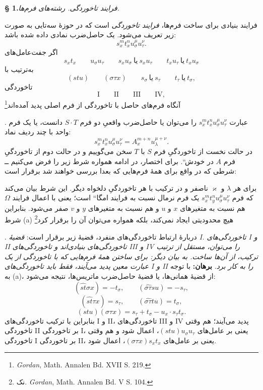 \documentclass[11pt]{article}
\providecommand{\glqq}{\textquotedblbase}
\providecommand{\grqq}{\textquotedblleft}
\providecommand{\srcnumdisplay}[3][3.4em]{%
  \par\smallskip\noindent
  \babelsublr{\begin{minipage}[t]{#1}\vspace*{0pt}\srcLTR{#2}\end{minipage}%
  \begin{minipage}[t]{\dimexpr\linewidth-#1\relax}\vspace*{0pt}\centering
  \(\displaystyle #3\)\end{minipage}}\par\smallskip}
\newcommand{\srcLTR}[1]{\relax\ifmmode\text{\mbox{\babelsublr{\foreignlanguage{english}{#1}}}}\else\babelsublr{\foreignlanguage{english}{#1}}\fi}
\newcommand{\srcfn}[2]{\begingroup\renewcommand{\thefootnote}{\srcLTR{#1}}\footnote{#2}\addtocounter{footnote}{-1}\endgroup}
\begin{document}
\begin{center}
\textbf{§ 1.}\quad \emph{فرایند تاخوردگی. رشته‌های فرم‌ها.}
\end{center}

فرایند بنیادی برای ساخت فرم‌ها، \emph{فرایند تاخوردگی} است که در حوزهٔ سه‌تایی به صورت زیر تعریف می‌شود. یک حاصل‌ضرب نمادی داده شده باشد:
\[
s_x^m t_x^n u_\sigma^\mu u_\tau^\nu .
\]
اگر جفت‌عامل‌های
\[
s_xt_x\qquad u_\sigma u_\tau\qquad s_xu_\sigma\ \text{یا}\ s_xu_\tau
\qquad t_xu_\tau\ \text{یا}\ t_xu_\sigma
\]
به‌ترتیب با
\[
(stu)\qquad (\sigma\tau x)\qquad s_\sigma\ \text{یا}\ s_\tau
\qquad t_\tau\ \text{یا}\ t_\sigma,
\]
تاخوردگی
\[
\text{I}\qquad\text{II}\qquad\text{III}\qquad\text{IV},
\]
آنگاه فرم‌های حاصل با تاخوردگی از فرم اصلی پدید آمده‌اند\srcfn{*)}{\emph{Gordan}, Math. Annalen Bd. XVII S. 219.}.
عبارت $s_x^m t_x^n u_\sigma^\mu u_\tau^\nu$ را می‌توان یا حاصل‌ضرب واقعیِ دو فرم $S\cdot T$ دانست، یا یک فرم واحد با چند ردیف نماد:
\[
s_x^m t_x^n u_\sigma^\mu u_\tau^\nu=A_x^{m+n}u_\lambda^{\mu+\nu}.
\]
در حالت نخست از تاخوردگیِ فرم $S$ با $T$ سخن می‌گوییم و در حالت دوم از \glqq{}تاخوردگیِ فرم $A$ در خودش\grqq{}. برای اختصار، در ادامه همواره شرط زیر را فرض می‌کنیم ــ شرطی که در واقع برای همهٔ فرم‌هایی که بعدا بررسی خواهند شد برقرار است:
\srcnumdisplay{(a)}{\begin{gathered}
s_\sigma^\lambda=0,\\
t_\tau^\varkappa=0
\end{gathered}}
برای هر $\lambda$ و $\varkappa$ ناصفر و در ترکیب با هر تاخوردگیِ دلخواه دیگر. این شرط بیان می‌کند که فرم $s_x^m t_y^n u_\sigma^\mu u_\tau^\nu$ یک \glqq{}فرم نرمال نسبت به فرایند امگا\grqq{} است؛ یعنی با اعمال فرایند $\Omega$ هم نسبت به متغیرهای $x$ و $u$ و هم نسبت به متغیرهای $y$ و $v$ صفر می‌شود.
بنابراین شرط (a) هیچ محدودیتی ایجاد نمی‌کند، بلکه همواره می‌توان آن را برقرار کرد\srcfn{*)}{نک. \emph{Gordan}, Math. Annalen Bd. V S. 104.}.
دربارهٔ ارتباط تاخوردگی‌های منفرد، قضیهٔ زیر برقرار است:
\emph{قضیهٔ I. تاخوردگی‌های I و II تاخوردگی‌های بنیادی‌اند و تاخوردگی‌های III و IV را می‌توان، مستقل از ترتیب ترکیب، از آن‌ها ساخت. به بیان دیگر: برای ساختن همهٔ فرم‌هایی که با تاخوردگی از یک عبارت معین پدید می‌آیند، فقط باید تاخوردگی‌های I و II را به کار برد.}
\textbf{برهان:} با توجه به (a)، از قضیهٔ همانی‌ها، یا قضیهٔ حاصل‌ضرب ماتریس‌ها، نتیجه می‌شود:
\[
(\widehat{st}\sigma x)=-t_\sigma,\qquad
(\widehat{\sigma\tau}su)=-s_\tau,
\]
\[
(\widehat{st}\tau x)=s_\tau,\qquad
(\widehat{\sigma\tau}tu)=t_\sigma,
\]
\[
(stu)(\sigma\tau x)=s_\tau+t_\sigma-u_x\cdot s_\tau t_\sigma .
\]
بنابراین با ترکیب تاخوردگی‌های I و II، تاخوردگی‌های III و IV پدید می‌آیند؛ هم وقتی تاخوردگی II بر تاخوردگی I، یعنی بر عامل‌های $(stu)u_\sigma u_\tau$، اعمال شود و هم وقتی تاخوردگی I بر تاخوردگی II، یعنی بر عامل‌های $(\sigma\tau x)s_xt_x$، اعمال شود.
\end{document}
